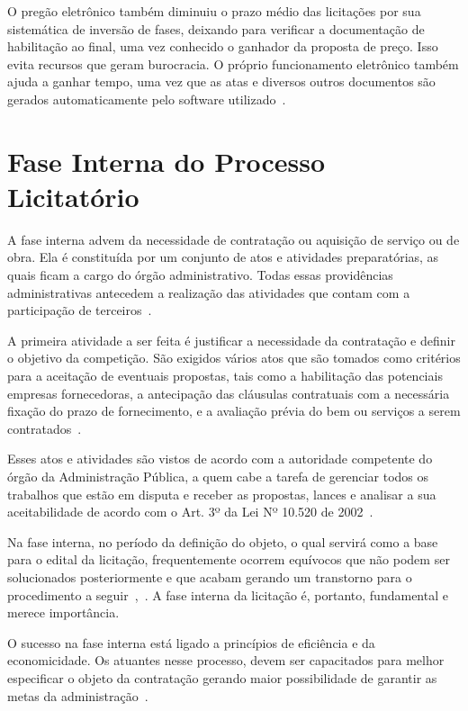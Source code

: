 O pregão eletrônico também diminuiu o prazo médio das licitações por sua sistemática de inversão de fases, deixando para verificar a documentação de habilitação ao final, uma vez conhecido o ganhador da proposta de preço.
Isso evita recursos que geram burocracia. 
O próprio funcionamento eletrônico também ajuda a ganhar tempo, uma vez que as atas e diversos outros documentos são gerados automaticamente pelo software utilizado~\cite{mello2016licitaccao}. 


\chapter[Fase Interna do Processo Licitatório]{Fase Interna do Processo Licitatório}\label{Capitulo2}

A fase interna advem da necessidade de contratação ou aquisição de serviço ou de obra.
Ela é constituída por um conjunto de atos e atividades preparatórias, as quais ficam a cargo do órgão administrativo.
Todas essas providências administrativas antecedem a realização das atividades que contam com a participação de terceiros~\cite{meirelles2011direito}.

A primeira atividade a ser feita é justificar a necessidade da contratação e definir o objetivo da competição.
São exigidos vários atos que são tomados como critérios para a aceitação de eventuais propostas, tais como a habilitação das potenciais empresas fornecedoras, a antecipação das cláusulas contratuais com a necessária fixação do prazo de fornecimento, e a avaliação prévia do bem ou serviços a serem contratados~\cite{carvalho2013manual}.

Esses atos e atividades são vistos de acordo com a autoridade competente do órgão da Administração Pública, a quem cabe a tarefa de gerenciar todos os trabalhos que estão em disputa e receber as propostas, lances e analisar a sua aceitabilidade de acordo com o Art. 3º da Lei Nº 10.520 de 2002~\cite{fernandes2005politicas}.

Na fase interna, no período da definição do objeto, o qual servirá como a base para o edital da licitação, frequentemente ocorrem equívocos que não podem ser solucionados posteriormente e que acabam gerando um transtorno para o procedimento a seguir~\cite{camarao2017fase},~\cite{de2007curso}. 
A fase interna da licitação é, portanto, fundamental e merece importância.

O sucesso na fase interna está ligado a princípios de eficiência e da economicidade.
Os atuantes nesse processo, devem ser capacitados para melhor especificar o objeto da contratação gerando maior possibilidade de garantir as metas da administração~\cite{camarao2017fase}.